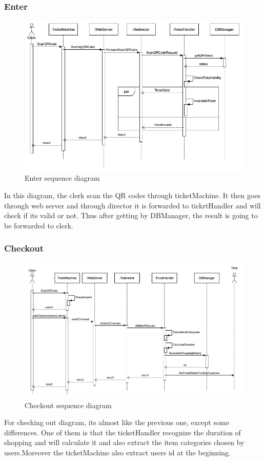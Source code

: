 \subsubsection{Enter}
\begin{figure}[H]
  \centering
  \includegraphics[width=\textwidth, keepaspectratio]{images/sequences/Enter.png}
  \caption{Enter sequence diagram}
\end{figure}
\vspace{2cm}
In this diagram, the clerk scan the QR codes through ticketMachine. It then goes through web server and through director it is forwarded to tickrtHandler and will check if its valid or not. Thus after getting by DBManager, the result is going to be forwarded to clerk.


\subsubsection{Checkout}
\begin{figure}[H]
  \centering
  \includegraphics[width=\textwidth, keepaspectratio]{images/sequences/Checkout.png}
  \caption{Checkout sequence diagram}
\end{figure}
\vspace{2cm}
For checking out diagram, its almost like the previous one, except some differences. One of them is that the ticketHandler recognize the duration of shopping and will calculate it and also extract the item categories chosen by users.Moreover the ticketMachine also extract users id at the beginning.

